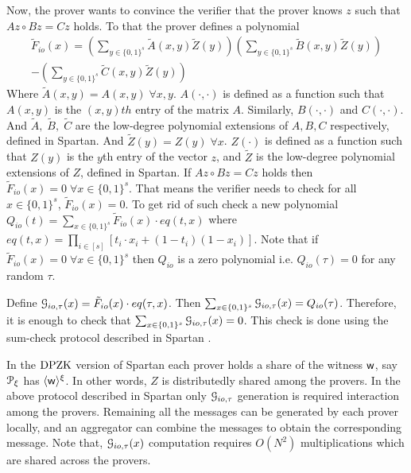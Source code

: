 Now, the prover wants to convince the verifier that the prover knows $z$ such that $A z \circ B z =C z$ holds. To that the prover defines a polynomial 
\begin{align*}
\tilde{F}_{io}(x)=\left(\sum_{y\in\{0,1\}^s}\tilde{A}(x,y)\tilde{Z}(y)\right)\left(\sum_{y\in\{0,1\}^s}\tilde{B}(x,y)\tilde{Z}(y)\right)\\ -\left(\sum_{y\in\{0,1\}^s}\tilde{C}(x,y)\tilde{Z}(y)\right)
\end{align*}
Where $\tilde{A}(x,y) = A(x,y)\;\forall  x,y$. $A(\cdot, \cdot)$ is defined as a function such that $A(x,y)$ is the $(x,y)th$ entry of the matrix $A$. Similarly, $B(\cdot, \cdot)$ and $C(\cdot, \cdot)$. And $\tilde{A},\;\tilde{B},\;\tilde{C}$ are the low-degree polynomial extensions of $A, B, C$ respectively, defined in Spartan\cite{spartan}. And $\tilde{Z}(y) = Z(y)\;\forall  x$. $Z(\cdot)$ is defined as a function such that $Z(y)$ is the $y$th entry of the vector $z$, and $\tilde{Z}$ is the low-degree polynomial extensions of $Z$, defined in Spartan\cite{spartan}.
If $Az\circ Bz =Cz$ holds then $\tilde{F}_{io}(x)=0\;\forall x\in\{0,1\}^s$. That means the verifier needs to check for all $x\in\{0,1\}^s$, $\tilde{F}_{io}(x)=0$. To get rid of such check a new polynomial $Q_{io}(t) = \sum_{x\in\{0,1\}^s}\tilde{F}_{io}(x) \cdot eq(t,x)$ where $eq(t,x) = \prod_{i\in[s]}[t_i\cdot x_i+(1-t_i)(1-x_i)]$. Note that if $\tilde{F}_{io}(x)=0\;\forall x\in\{0,1\}^s$ then $Q_{io}$ is a zero polynomial i.e. $Q_{io}(\tau)=0$ for any random $\tau$. 

Define $\mathcal{G}_{io,\tau}(x)=\tilde{F}_{io}(x)\cdot eq(\tau,x)$. Then $\sum_{x\in\{0,1\}^s} \mathcal{G}_{io,\tau}(x) = Q_{io}(\tau)$. Therefore, it is enough to check that $\sum_{x\in\{0,1\}^s} \mathcal{G}_{io,\tau}(x) = 0$. This check is done using the sum-check protocol described in Spartan \cite{spartan}.


In the $\text{DPZK}$ version of Spartan \cite{spartan} each prover holds a share of the witness $\mathsf{w}$, say $\mathcal{P}_\xi$ has $\langle{\mathsf{w}}\rangle^\xi$. In other words, $Z$ is distributedly shared among the provers. In the above protocol described in Spartan \cite{spartan} only $\mathcal{G}_{io,\tau}$ generation is required interaction among the provers. Remaining all the messages can be generated by each prover locally, and an aggregator can combine the messages to obtain the corresponding message. Note that, $\mathcal{G}_{io,\tau}(x)$ computation requires $O(N^2)$ multiplications which are shared across the provers.

